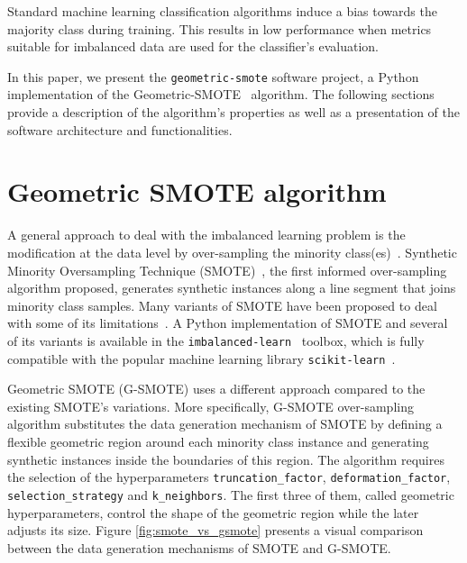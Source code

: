 \documentclass[twoside,11pt]{article}
\begin{document}
Standard machine learning classification algorithms induce a bias towards the
majority class during training. This results in low performance when metrics
suitable for imbalanced data are used for the classifier's evaluation.

In this paper, we present the \texttt{geometric-smote} software project, a
Python implementation of the Geometric-SMOTE~\citep{Douzas2019} algorithm. The
following sections provide a description of the algorithm's properties as well
as a presentation of the software architecture and functionalities.

\section{Geometric SMOTE algorithm}
\label{oversampling}

A general approach to deal with the imbalanced learning problem is the
modification at the data level by over-sampling the minority
class(es)~\citep{Fernandez2013}. Synthetic Minority Oversampling Technique
(SMOTE)~\citep{Chawla2002}, the first informed over-sampling algorithm proposed,
generates synthetic instances along a line segment that joins minority class
samples. Many variants of SMOTE have been proposed to deal with some of its
limitations~\citep{He2009}. A Python implementation of SMOTE and several of its
variants is available in the \texttt{imbalanced-learn}~\citep{Lemaitre2016}
toolbox, which is fully compatible with the popular machine learning library
\texttt{scikit-learn}~\citep{Pedregosa2011}.

Geometric SMOTE (G-SMOTE) uses a different approach compared to the existing
SMOTE's variations. More specifically, G-SMOTE over-sampling algorithm
substitutes the data generation mechanism of SMOTE by defining a flexible
geometric region around each minority class instance and generating synthetic
instances inside the boundaries of this region. The algorithm requires the
selection of the hyperparameters \texttt{truncation\_factor},
\texttt{deformation\_factor}, \texttt{selection\_strategy} and
\texttt{k\_neighbors}. The first three of them, called geometric
hyperparameters, control the shape of the geometric region while the later
adjusts its size. Figure \ref{fig:smote_vs_gsmote} presents a visual comparison
between the data generation mechanisms of SMOTE and G-SMOTE.
\end{document}
